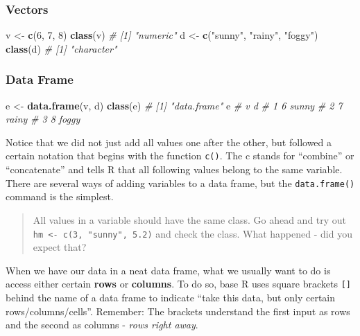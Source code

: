 \documentclass[
]{book}
\newenvironment{Shaded}{\begin{snugshade}}{\end{snugshade}}
\newcommand{\CommentTok}[1]{\textcolor[rgb]{0.56,0.35,0.01}{\textit{#1}}}
\newcommand{\DecValTok}[1]{\textcolor[rgb]{0.00,0.00,0.81}{#1}}
\newcommand{\FunctionTok}[1]{\textcolor[rgb]{0.13,0.29,0.53}{\textbf{#1}}}
\newcommand{\NormalTok}[1]{#1}
\newcommand{\OtherTok}[1]{\textcolor[rgb]{0.56,0.35,0.01}{#1}}
\newcommand{\StringTok}[1]{\textcolor[rgb]{0.31,0.60,0.02}{#1}}
\begin{document}
\subsubsection*{Vectors}\label{vectors}

\begin{Shaded}
\begin{Highlighting}[]
\NormalTok{v }\OtherTok{\textless{}{-}} \FunctionTok{c}\NormalTok{(}\DecValTok{6}\NormalTok{, }\DecValTok{7}\NormalTok{, }\DecValTok{8}\NormalTok{)}
\FunctionTok{class}\NormalTok{(v)}
\CommentTok{\# [1] "numeric"}
\NormalTok{d }\OtherTok{\textless{}{-}} \FunctionTok{c}\NormalTok{(}\StringTok{"sunny"}\NormalTok{, }\StringTok{"rainy"}\NormalTok{, }\StringTok{"foggy"}\NormalTok{)}
\FunctionTok{class}\NormalTok{(d)}
\CommentTok{\# [1] "character"}
\end{Highlighting}
\end{Shaded}

\subsubsection*{Data Frame}\label{data-frame}

\begin{Shaded}
\begin{Highlighting}[]
\NormalTok{e }\OtherTok{\textless{}{-}} \FunctionTok{data.frame}\NormalTok{(v, d)}
\FunctionTok{class}\NormalTok{(e)}
\CommentTok{\# [1] "data.frame"}
\NormalTok{e}
\CommentTok{\#   v     d}
\CommentTok{\# 1 6 sunny}
\CommentTok{\# 2 7 rainy}
\CommentTok{\# 3 8 foggy}
\end{Highlighting}
\end{Shaded}

Notice that we did not just add all values one after the other, but followed a certain notation that begins with the function \texttt{c()}.
The c stands for ``combine'' or ``concatenate'' and tells R that all following values belong to the same variable.
There are several ways of adding variables to a data frame, but the \texttt{data.frame()} command is the simplest.

\begin{quote}
All values in a variable should have the same class.
Go ahead and try out \texttt{hm\ \textless{}-\ c(3,\ "sunny",\ 5.2)} and check the class.
What happened - did you expect that?
\end{quote}

When we have our data in a neat data frame, what we usually want to do is access either certain \textbf{rows} or \textbf{columns}.
To do so, base R uses square brackets \texttt{{[}{]}} behind the name of a data frame to indicate ``take this data, but only certain rows/columns/cells''.
Remember: The brackets understand the first input as rows and the second as columns - \emph{rows right away}.
\end{document}
